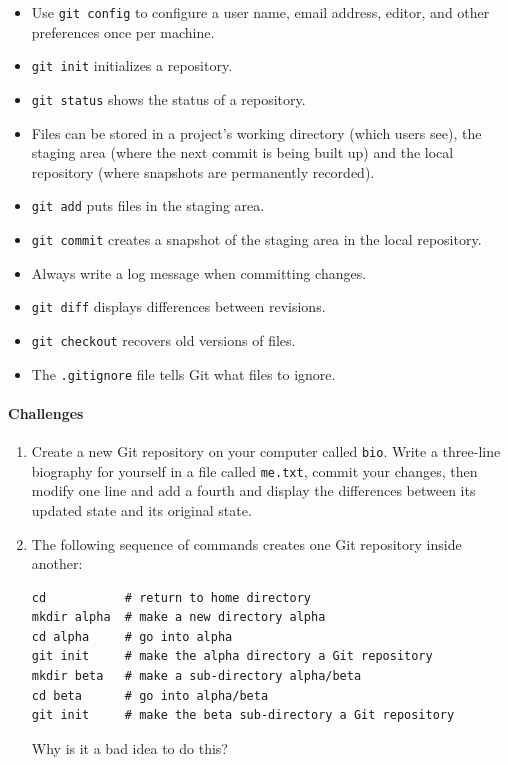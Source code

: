 \documentclass[]{book}
\begin{document}
\begin{itemize}
\item
  Use \texttt{git config} to configure a user name, email address,
  editor, and other preferences once per machine.
\item
  \texttt{git init} initializes a repository.
\item
  \texttt{git status} shows the status of a repository.
\item
  Files can be stored in a project's working directory (which users
  see), the staging area (where the next commit is being built up) and
  the local repository (where snapshots are permanently recorded).
\item
  \texttt{git add} puts files in the staging area.
\item
  \texttt{git commit} creates a snapshot of the staging area in the
  local repository.
\item
  Always write a log message when committing changes.
\item
  \texttt{git diff} displays differences between revisions.
\item
  \texttt{git checkout} recovers old versions of files.
\item
  The \texttt{.gitignore} file tells Git what files to ignore.
\end{itemize}

\mbox{}\paragraph{Challenges}

\begin{enumerate}
\item
  Create a new Git repository on your computer called \texttt{bio}.
  Write a three-line biography for yourself in a file called
  \texttt{me.txt}, commit your changes, then modify one line and add a
  fourth and display the differences between its updated state and its
  original state.
\item
  The following sequence of commands creates one Git repository inside
  another:

\begin{verbatim}
cd           # return to home directory
mkdir alpha  # make a new directory alpha
cd alpha     # go into alpha
git init     # make the alpha directory a Git repository
mkdir beta   # make a sub-directory alpha/beta
cd beta      # go into alpha/beta
git init     # make the beta sub-directory a Git repository
\end{verbatim}

  Why is it a bad idea to do this?
\end{enumerate}
\end{document}
